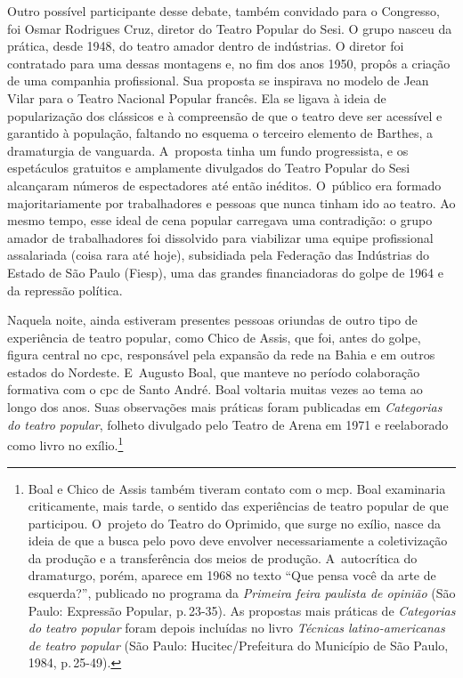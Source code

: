 Outro possível participante desse debate, também convidado para o
Congresso, foi Osmar Rodrigues Cruz, diretor do Teatro Popular do Sesi.
O grupo nasceu da prática, desde 1948, do teatro amador dentro de indústrias.
O diretor foi contratado para uma dessas montagens e, no fim
dos anos 1950, propôs a criação de uma companhia profissional. Sua
proposta se inspirava no modelo de Jean Vilar para o Teatro
Nacional Popular francês. Ela se ligava à ideia de popularização dos
clássicos e à compreensão de que o teatro deve ser acessível e garantido
à população, faltando no esquema o terceiro elemento de Barthes, a
dramaturgia de vanguarda. A~proposta tinha um fundo progressista, e os
espetáculos gratuitos e amplamente divulgados do Teatro Popular do Sesi
alcançaram números de espectadores até então inéditos. O~público era
formado majoritariamente por trabalhadores e pessoas que nunca tinham
ido ao teatro. Ao mesmo tempo, esse ideal de cena popular carregava uma
contradição: o grupo amador de trabalhadores foi dissolvido para
viabilizar uma equipe profissional assalariada (coisa rara até hoje),
subsidiada pela Federação das Indústrias do Estado de São Paulo (Fiesp),
uma das grandes financiadoras do golpe de 1964 e da repressão política.

Naquela noite, ainda estiveram presentes pessoas oriundas de outro tipo de experiência de teatro popular, como Chico de Assis, que foi, antes do golpe,
figura central no {\sc cpc}, responsável pela expansão da rede na Bahia e em
outros estados do Nordeste. E~Augusto Boal, que manteve no período
colaboração formativa com o {\sc cpc} de Santo André. Boal
voltaria muitas vezes ao tema ao longo dos anos. Suas observações mais práticas foram
publicadas em {\it Categorias do teatro popular}, folheto divulgado pelo
Teatro de Arena em 1971 e reelaborado como livro no exílio.\footnote{Boal
  e Chico de Assis também tiveram contato com o {\sc mcp}. Boal examinaria
  criticamente, mais tarde, o sentido das experiências de teatro popular
  de que participou. O~projeto do Teatro do Oprimido, que surge no
  exílio, nasce da ideia de que a busca pelo povo deve envolver
  necessariamente a coletivização da produção e a transferência dos
  meios de produção. A~autocrítica do dramaturgo, porém, aparece em
  1968 no texto “Que pensa você da arte de esquerda?”, publicado no
  programa da {\it Primeira feira paulista de opinião} (São Paulo:
  Expressão Popular, p.\,23-35). As propostas mais práticas de
  {\it Categorias do teatro popular} foram depois incluídas no livro
  {\it Técnicas latino-americanas de teatro popular} (São Paulo:
  Hucitec/Prefeitura do Município de São Paulo, 1984, p.\,25-49).}

